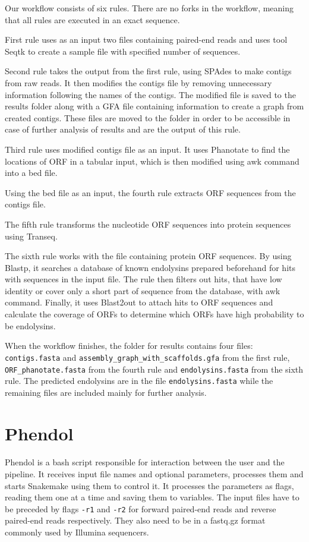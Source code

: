 Our workflow consists of six rules. There are no forks in the workflow, meaning that all rules are executed in an exact sequence.

First rule uses as an input two files containing paired-end reads and uses tool Seqtk to create a sample file with specified number of sequences.

Second rule takes the output from the first rule, using SPAdes to make contigs from raw reads. It then modifies the contigs file by removing unnecessary information following the names of the contigs. The modified file is saved to the results folder along with a GFA file containing information to create a graph from created contigs. These files are moved to the folder in order to be accessible in case of further analysis of results and are the output of this rule.

Third rule uses modified contigs file as an input. It uses Phanotate to find the locations of ORF in a tabular input, which is then modified using awk command into a bed file. 

Using the bed file as an input, the fourth rule extracts ORF sequences from the contigs file. 

The fifth rule transforms the nucleotide ORF sequences into protein sequences using Transeq.

The sixth rule works with the file containing protein ORF sequences. By using Blastp, it searches a database of known endolysins prepared beforehand for hits with sequences in the input file. The rule then filters out hits, that have low identity or cover only a short part of sequence from the database, with awk command. Finally, it uses Blast2out to attach hits to ORF sequences and calculate the coverage of ORFs to determine which ORFs have high probability to be endolysins.

When the workflow finishes, the folder for results contains four files: \texttt{contigs.fasta} and \texttt{assembly\_graph\_with\_scaffolds.gfa} from the first rule, \texttt{ORF\_phanotate.fasta} from the fourth rule and \texttt{endolysins.fasta} from the sixth rule. The predicted endolysins are in the file \texttt{endolysins.fasta} while the remaining files are included mainly for further analysis.

\section{Phendol}
\paragraph*{}
Phendol is a bash script responsible for interaction between the user and the pipeline. It receives input file names and optional parameters, processes them and starts Snakemake using them to control it. It processes the parameters as flags, reading them one at a time and saving them to variables. The input files have to be preceded by flags \texttt{-r1} and \texttt{-r2} for forward paired-end reads and reverse paired-end reads respectively. They also need to be in a fastq.gz format commonly used by Illumina sequencers.

